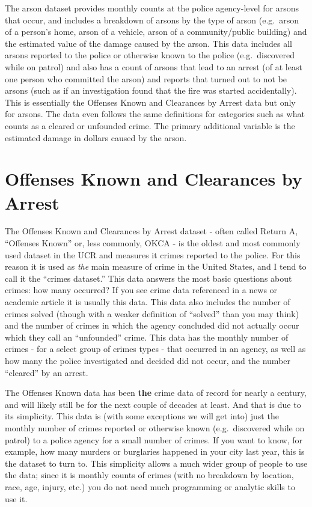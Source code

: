 \documentclass[
]{krantz}
\begin{document}
The arson dataset provides monthly counts at the police
agency-level for arsons that occur, and includes a breakdown
of arsons by the type of arson (e.g.~arson of a person's
home, arson of a vehicle, arson of a community/public
building) and the estimated value of the damage caused by
the arson. This data includes all arsons reported to the
police or otherwise known to the police (e.g.~discovered
while on patrol) and also has a count of arsons that lead to
an arrest (of at least one person who committed the arson)
and reports that turned out to not be arsons (such as if an
investigation found that the fire was started accidentally).
This is essentially the Offenses Known and Clearances by
Arrest data but only for arsons. The data even follows the
same definitions for categories such as what counts as a
cleared or unfounded crime. The primary additional variable
is the estimated damage in dollars caused by the arson.

\chapter{Offenses Known and Clearances by
Arrest}\label{offensesKnown}

The Offenses Known and Clearances by Arrest dataset - often
called Return A, ``Offenses Known'' or, less commonly, OKCA
- is the oldest and most commonly used dataset in the UCR
and measures it crimes reported to the police. For this
reason it is used as \emph{the} main measure of crime in the
United States, and I tend to call it the ``crimes dataset.''
This data answers the most basic questions about crimes: how
many occurred? If you see crime data referenced in a news or
academic article it is usually this data. This data also
includes the number of crimes solved (though with a weaker
definition of ``solved'' than you may think) and the number
of crimes in which the agency concluded did not actually
occur which they call an ``unfounded'' crime. This data has
the monthly number of crimes - for a select group of crimes
types - that occurred in an agency, as well as how many the
police investigated and decided did not occur, and the
number ``cleared'' by an arrest.

The Offenses Known data has been \textbf{the} crime data of
record for nearly a century, and will likely still be for
the next couple of decades at least. And that is due to its
simplicity. This data is (with some exceptions we will get
into) just the monthly number of crimes reported or
otherwise known (e.g.~discovered while on patrol) to a
police agency for a small number of crimes. If you want to
know, for example, how many murders or burglaries happened
in your city last year, this is the dataset to turn to. This
simplicity allows a much wider group of people to use the
data; since it is monthly counts of crimes (with no
breakdown by location, race, age, injury, etc.) you do not
need much programming or analytic skills to use it.
\end{document}
